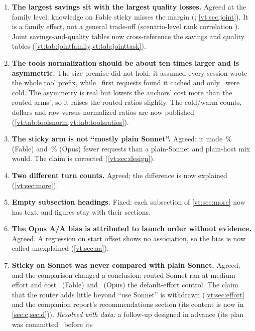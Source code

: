 \begin{enumerate}[leftmargin=1.6em]
    and training values, notes that the \QFableStickyMarginGap\ margin comes from the unfiltered quality test and is
    thin, though not a bootstrap artefact (\cref{vt:sec:confirm}). Table and figure headers now label both readings
    co-primary.
  \item \textbf{The largest savings sit with the largest quality losses.} Agreed at the family level: knowledge on
    Fable sticky misses the margin (\RvKnowFableSticky; \cref{vt:sec:joint}). It is a family effect, not a general
    trade-off (scenario-level rank correlation \RvSpearman). Joint savings-and-quality tables now cross-reference the
    savings and quality tables (\cref{vt:tab:jointfamily,vt:tab:jointtask}).
  \item \textbf{The tools normalization should be about ten times larger and is asymmetric.} The size premise did not
    hold: it assumed every session wrote the whole tool prefix, while \RvWarmTotal\ first requests found it cached and
    only \RvColdTotal\ were cold. The asymmetry is real but lowers the anchors' cost more than the routed arms', so it
    raises the routed ratios slightly. The cold/warm counts, dollars and raw-versus-normalized ratios are now
    published (\cref{vt:tab:toolsnorm,vt:tab:toolsratios}).
  \item \textbf{The sticky arm is not ``mostly plain Sonnet''.} Agreed: it made \RvReqGapFable\,\% (Fable) and
    \RvReqGapOpus\,\% (Opus) fewer requests than a plain-Sonnet and plain-host mix would. The claim is corrected
    (\cref{vt:sec:design}).
  \item \textbf{Two different turn counts.} Agreed; the difference is now explained (\cref{vt:sec:more}).
  \item \textbf{Empty subsection headings.} Fixed: each subsection of \cref{vt:sec:more} now has text, and figures stay
    with their sections.
  \item \textbf{The Opus A/A bias is attributed to launch order without evidence.} Agreed. A regression on start offset
    shows no association, so the bias is now called unexplained (\cref{vt:sec:aa}).
  \item \textbf{Sticky on Sonnet was never compared with plain Sonnet.} Agreed, and the comparison changed a
    conclusion: routed Sonnet ran at medium effort and cost \RvEffFableAll\X\ (Fable) and \RvEffOpusAll\X\ (Opus) the
    default-effort control. The claim that the router adds little beyond ``use Sonnet'' is withdrawn
    (\cref{vt:sec:effort} and the companion report's recommendations section (its content is now in \cref{sec:c,sec:d})). \emph{Resolved with data:} a follow-up designed in advance (its plan was committed \EcFirstAfter\ before its

\end{enumerate}
